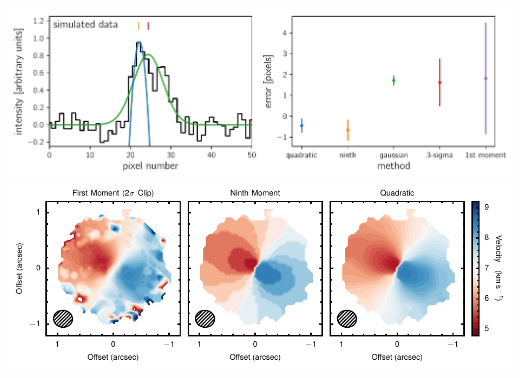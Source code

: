\documentclass{minimal}
\begin{document}
\centering
\includegraphics[width=\textwidth]{../notebooks/simulated-spectrum.pdf}
\includegraphics[width=\textwidth]{../notebooks/moment_comparison.pdf}
\end{document}
